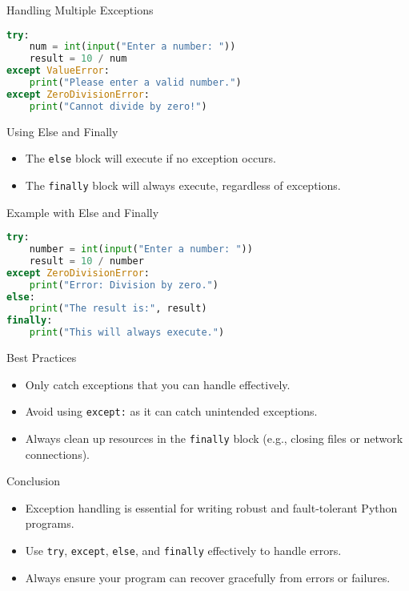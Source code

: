 \begin{frame}[fragile]{Handling Multiple Exceptions}
\begin{lstlisting}[language=Python]
try:
    num = int(input("Enter a number: "))
    result = 10 / num
except ValueError:
    print("Please enter a valid number.")
except ZeroDivisionError:
    print("Cannot divide by zero!")
\end{lstlisting}
\end{frame}

\begin{frame}{Using Else and Finally}
    \begin{itemize}
        \item The \texttt{else} block will execute if no exception occurs.
        \item The \texttt{finally} block will always execute, regardless of exceptions.
    \end{itemize}
\end{frame}

\begin{frame}[fragile]{Example with Else and Finally}
\begin{lstlisting}[language=Python]
try:
    number = int(input("Enter a number: "))
    result = 10 / number
except ZeroDivisionError:
    print("Error: Division by zero.")
else:
    print("The result is:", result)
finally:
    print("This will always execute.")
\end{lstlisting}
\end{frame}

\begin{frame}{Best Practices}
    \begin{itemize}
        \item Only catch exceptions that you can handle effectively.
        \item Avoid using \texttt{except:} as it can catch unintended exceptions.
        \item Always clean up resources in the \texttt{finally} block (e.g., closing files or network connections).
    \end{itemize}
\end{frame}

\begin{frame}{Conclusion}
    \begin{itemize}
        \item Exception handling is essential for writing robust and fault-tolerant Python programs.
        \item Use \texttt{try}, \texttt{except}, \texttt{else}, and \texttt{finally} effectively to handle errors.
        \item Always ensure your program can recover gracefully from errors or failures.
    \end{itemize}
\end{frame}


